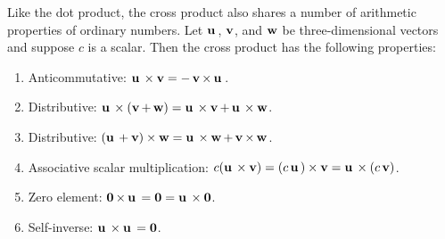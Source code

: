Like the dot product, the cross product also shares a number of
arithmetic properties of ordinary numbers. Let $\vecu$, $\vecv$, and
$\vecw$ be three-dimensional vectors and suppose $c$ is a scalar. Then
the cross product has the following properties:
%
\begin{enumerate}
\item Anticommutative:
  $\vecu \times \vecv = - \vecv \times \vecu$.

\item Distributive:
  $\vecu \times (\vecv + \vecw)
  =
  \vecu \times \vecv + \vecu \times \vecw$.

\item Distributive:
  $(\vecu + \vecv) \times \vecw
  =
  \vecu \times \vecw + \vecv \times \vecw$.

\item Associative scalar multiplication:
  $c (\vecu \times \vecv)
  =
  (c\vecu) \times \vecv
  = \vecu \times (c\vecv)$.

\item Zero element:
  $\veczero \times \vecu
  =
  \veczero
  =
  \vecu \times \veczero$.

\item Self-inverse: $\vecu \times \vecu = \veczero$.
\end{enumerate}

